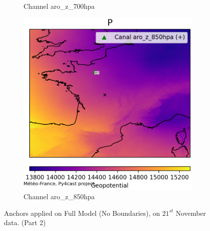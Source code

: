 \begin{figure}[h]
\begin{subfigure}[b]{0.44\textwidth}
        \caption{Channel aro\_z\_700hpa}
    \end{subfigure}
    \hfill
    \begin{subfigure}[b]{0.44\textwidth}
        \includegraphics[width=\textwidth]{Images/titan_rain_anchors/nov-21/complete/2023112100_feature_aro_z_850hpa.png}
        \caption{Channel aro\_z\_850hpa}
    \end{subfigure}
    \caption{Anchors applied on Full Model (No Boundaries), on $21^{st}$ November data. (Part 2)}
    \label{fig:titan-full-anchors-21}
\end{figure}

